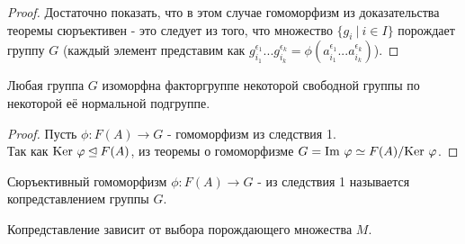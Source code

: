 \begin{proof}
    Достаточно показать, что в этом случае гомоморфизм из доказательства теоремы сюръективен - это следует из того, что множество $\{g_i \ | \ i \in I\}$ порождает группу $G$ (каждый элемент представим как $g_{i_1}^{\epsilon_1}...g_{i_k}^{\epsilon_k} = \phi(a_{i_1}^{\epsilon_1}...a_{i_k}^{\epsilon_k})$).
\end{proof}
\begin{consequensenum}
    Любая группа $G$ изоморфна факторгруппе некоторой свободной группы по некоторой её нормальной подгруппе.
\end{consequensenum}
\begin{proof}
    Пусть $\phi: F(A) \rightarrow G$ - гомоморфизм из следствия 1.\\
    Так как $\textup{Ker }\phi \unlhd F(A)$, из теоремы о гомоморфизме $G = \textup{Im }\phi \simeq F(A)/\textup{Ker }\phi$.
\end{proof}
\begin{definition}
    Сюръективный гомоморфизм $\phi: F(A) \rightarrow G$ - из следствия 1 называется копредставлением группы $G$.
\end{definition}
\begin{remark}
    Копредставление зависит от выбора порождающего множества $M$.
\end{remark}
